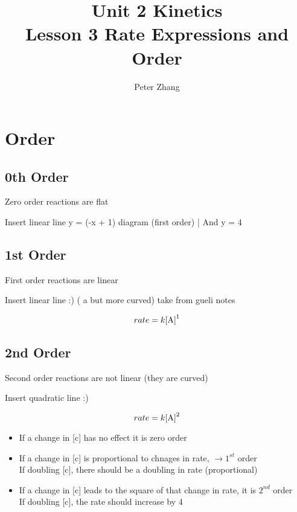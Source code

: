 \documentclass{article}
\title{Unit 2 Kinetics\\Lesson 3 Rate Expressions and Order}
\author{Peter Zhang}
\begin{document}
\maketitle
\newpage
\tableofcontents
\newpage


\section{Order}
\subsection{0th Order}
Zero order reactions are flat


Insert linear line y = (-x + 1) diagram (first order) | And y = 4

\subsection{1st Order}
First order reactions are linear

Insert linear line :) ( a but more curved) take from gueli notes

$$rate = k\ce{[A]}^1$$

\subsection{2nd Order}
Second order reactions are not linear (they are curved)

Insert quadratic line :)

$$rate = k\ce{[A]}^2$$



\begin{itemize}
\item If a change in [c] has no effect it is zero order
\item If a change in [c] is proportional to chnages in rate,  $\rightarrow 1^{st}$ order\\If doubling [c], there should be a doubling in rate (proportional)
\item If a change in [c] leads to the square of that change in rate, it is $2^{nd}$ order\\If doubling [c], the rate should increase by 4
\end{itemize}
\end{document}
